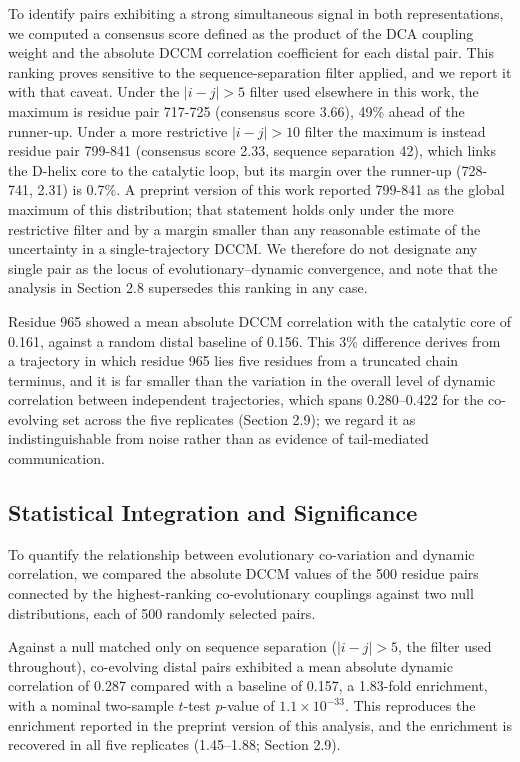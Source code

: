 \documentclass[utf8]{FrontiersinHarvard}
\begin{document}
To identify pairs exhibiting a strong simultaneous signal in both representations, we computed a consensus score defined as the product of the DCA coupling weight and the absolute DCCM correlation coefficient for each distal pair. This ranking proves sensitive to the sequence-separation filter applied, and we report it with that caveat. Under the $|i-j|>5$ filter used elsewhere in this work, the maximum is residue pair 717-725 (consensus score 3.66), 49\% ahead of the runner-up. Under a more restrictive $|i-j|>10$ filter the maximum is instead residue pair 799-841 (consensus score 2.33, sequence separation 42), which links the \textalpha{}D-helix core to the catalytic loop, but its margin over the runner-up (728-741, 2.31) is 0.7\%. A preprint version of this work reported 799-841 as the global maximum of this distribution; that statement holds only under the more restrictive filter and by a margin smaller than any reasonable estimate of the uncertainty in a single-trajectory DCCM. We therefore do not designate any single pair as the locus of evolutionary--dynamic convergence, and note that the analysis in Section 2.8 supersedes this ranking in any case.

Residue 965 showed a mean absolute DCCM correlation with the catalytic core of 0.161, against a random distal baseline of 0.156. This 3\% difference derives from a trajectory in which residue 965 lies five residues from a truncated chain terminus, and it is far smaller than the variation in the overall level of dynamic correlation between independent trajectories, which spans 0.280--0.422 for the co-evolving set across the five replicates (Section 2.9); we regard it as indistinguishable from noise rather than as evidence of tail-mediated communication.

\subsection{Statistical Integration and Significance}

To quantify the relationship between evolutionary co-variation and dynamic correlation, we compared the absolute DCCM values of the 500 residue pairs connected by the highest-ranking co-evolutionary couplings against two null distributions, each of 500 randomly selected pairs.

Against a null matched only on sequence separation ($|i-j|>5$, the filter used throughout), co-evolving distal pairs exhibited a mean absolute dynamic correlation of 0.287 compared with a baseline of 0.157, a 1.83-fold enrichment, with a nominal two-sample $t$-test $p$-value of $1.1 \times 10^{-33}$. This reproduces the enrichment reported in the preprint version of this analysis, and the enrichment is recovered in all five replicates (1.45--1.88; Section 2.9).
\end{document}
